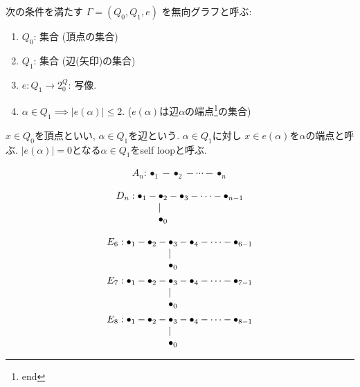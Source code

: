 \begin{definition}
  次の条件を満たす
  $\Gamma=(Q_0,Q_1,e)$
  を無向グラフと呼ぶ:
  \begin{enumerate}
  \item $Q_0$: 集合 (頂点の集合)
  \item $Q_1$: 集合 (辺(矢印)の集合)
  \item $e\colon Q_1\to 2^Q_0$: 写像.
  \item $\alpha\in Q_1\implies |e(\alpha)|\leq 2$.
    ($e(\alpha)$は辺$\alpha$の端点\footnote{end}の集合)
  \end{enumerate}
  $x\in Q_0$を頂点といい,
  $\alpha\in Q_1$を辺という.
  $\alpha\in Q_1$に対し
  $x\in e(\alpha)$を$\alpha$の端点と呼ぶ.
  $|e(\alpha)|=0$となる$\alpha\in Q_1$をself loopと呼ぶ.
\end{definition}
\begin{example}
  \begin{align*}
    A_n : \bullet_1 -\bullet_2-\cdots -\bullet_n
  \end{align*}
\end{example}
\begin{example}
  \begin{align*}
    D_n : \bullet_1 -\!\!\!\begin{array}[t]{l}\bullet_2\\|\\\bullet_0\end{array}\!\!\!-\bullet_3-\cdots -\bullet_{n-1}
  \end{align*}
\end{example}
\begin{example}
  \begin{align*}
    E_6 : \bullet_1-\bullet_2 -\!\!\!\begin{array}[t]{l}\bullet_3\\|\\\bullet_0\end{array}\!\!\!-\bullet_4-\cdots -\bullet_{6-1}\\
    E_7 : \bullet_1-\bullet_2 -\!\!\!\begin{array}[t]{l}\bullet_3\\|\\\bullet_0\end{array}\!\!\!-\bullet_4-\cdots -\bullet_{7-1}\\
    E_8 : \bullet_1-\bullet_2 -\!\!\!\begin{array}[t]{l}\bullet_3\\|\\\bullet_0\end{array}\!\!\!-\bullet_4-\cdots -\bullet_{8-1}\\
  \end{align*}
\end{example}

